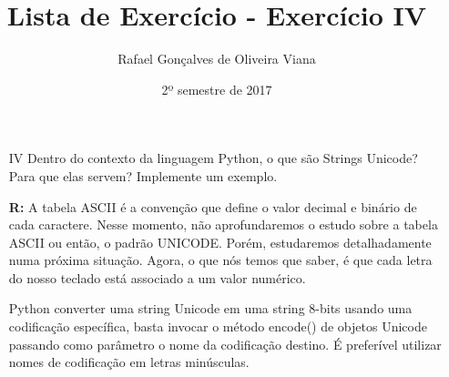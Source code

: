 \documentclass[12pt]{article}
\title{Lista de Exercício  - Exercício IV }
\author{Rafael Gonçalves de Oliveira Viana}
\date{2º semestre de 2017}
\begin{document}
\maketitle

\begin{enumerate}
\item[IV]
Dentro do contexto da linguagem Python, o que são Strings Unicode? Para que elas
servem? Implemente um exemplo.

\textbf{R:}
A tabela ASCII é a convenção que define o valor decimal e binário de cada caractere. Nesse momento, não aprofundaremos o estudo sobre a tabela ASCII ou então, o padrão UNICODE. Porém, estudaremos detalhadamente numa próxima situação. Agora, o que nós temos que saber, é que cada letra do nosso teclado está associado a um valor numérico.

Python converter uma string Unicode em uma string 8-bits usando uma codificação específica, basta invocar o método encode() de objetos Unicode passando como parâmetro o nome da codificação destino. É preferível utilizar nomes de codificação em letras minúsculas.

\inputminted{python}{Exemplo-4/StringUnicode.py}




\end{enumerate}
\end{document}

